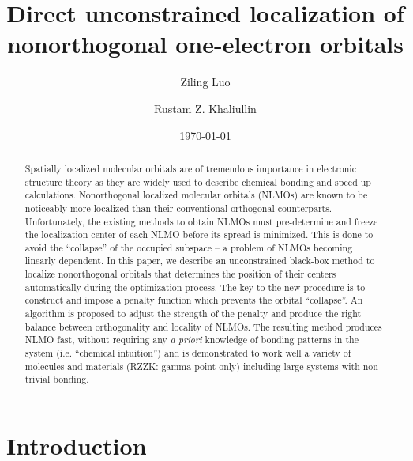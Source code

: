 \documentclass[aps,prl,reprint,amsmath,amssymb]{revtex4-1}
\begin{document}



\title{
Direct unconstrained localization of nonorthogonal one-electron orbitals
}

\author{Ziling Luo}
\author{Rustam Z. Khaliullin}

\date{\today}

\begin{abstract}
Spatially localized molecular orbitals are of tremendous importance in electronic structure theory as they are widely used to describe chemical bonding and speed up calculations.
Nonorthogonal localized molecular orbitals (NLMOs) are known to be noticeably more localized than their conventional orthogonal counterparts. 
Unfortunately, the existing methods to obtain NLMOs must pre-determine and freeze the localization center of each NLMO before its spread is minimized. 
This is done to avoid the ``collapse'' of the occupied subspace – a problem of NLMOs becoming linearly dependent. 
In this paper, we describe an unconstrained black-box method to localize nonorthogonal orbitals that determines the position of their centers automatically during the optimization process. 
The key to the new procedure is to construct and impose a penalty function which prevents the orbital ``collapse''. 
An algorithm is proposed to adjust the strength of the penalty and produce the right balance between orthogonality and locality of NLMOs. 
The resulting method produces NLMO fast, without requiring any \emph{a priori} knowledge of bonding patterns in the system (i.e. ``chemical intuition'') and is demonstrated to work well a variety of molecules and materials (RZZK: gamma-point only) including large systems with non-trivial bonding. 
\end{abstract}

\maketitle

\section{Introduction} 

\end{document}
